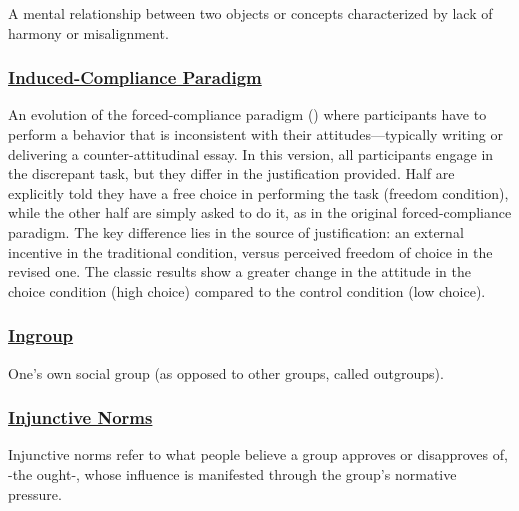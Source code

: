 \documentclass[
  letterpaper,
]{book}
\begin{document}
A mental relationship between two objects or concepts characterized by
lack of harmony or misalignment.

\subsubsection*{\texorpdfstring{\hyperref[def-inducedcomplianceparadigm]{Induced-Compliance
Paradigm}}{Induced-Compliance Paradigm}}\label{induced-compliance-paradigm}

An evolution of the forced-compliance paradigm
() where
participants have to perform a behavior that is inconsistent with their
attitudes---typically writing or delivering a counter-attitudinal essay.
In this version, all participants engage in the discrepant task, but
they differ in the justification provided. Half are explicitly told they
have a free choice in performing the task (freedom condition), while the
other half are simply asked to do it, as in the original
forced-compliance paradigm. The key difference lies in the source of
justification: an external incentive in the traditional condition,
versus perceived freedom of choice in the revised one. The classic
results show a greater change in the attitude in the choice condition
(high choice) compared to the control condition (low choice).

\subsubsection*{\texorpdfstring{\hyperref[def-ingroup]{Ingroup}}{Ingroup}}\label{ingroup}

One's own social group (as opposed to other groups, called outgroups).

\subsubsection*{\texorpdfstring{\hyperref[def-injunctivenorms]{Injunctive
Norms}}{Injunctive Norms}}\label{injunctive-norms}

Injunctive norms refer to what people believe a group approves or
disapproves of, -the ought-, whose influence is manifested through the
group's normative pressure.
\end{document}
